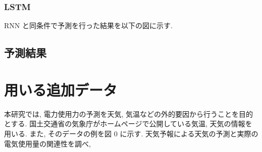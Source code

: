 
\subsubsection{LSTM}
RNN と同条件で予測を行った結果を以下の図に示す.



\subsection{予測結果}

\section{用いる追加データ}
本研究では, 電力使用力の予測を天気, 気温などの外的要因から行うことを目的とする.
国土交通省の気象庁がホームページで公開している気温, 天気の情報を用いる.
また, そのデータの例を図 0 に示す. 天気予報による天気の予測と実際の電気使用量の関連性を調べ, 


